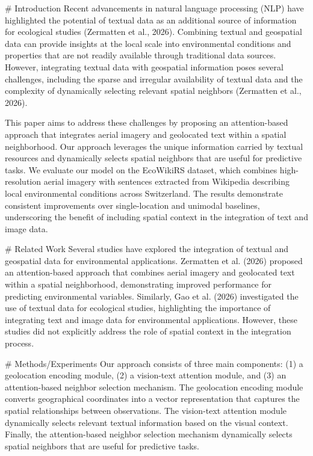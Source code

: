 # Introduction
Recent advancements in natural language processing (NLP) have highlighted the potential of textual data as an additional source of information for ecological studies (Zermatten et al., 2026). Combining textual and geospatial data can provide insights at the local scale into environmental conditions and properties that are not readily available through traditional data sources. However, integrating textual data with geospatial information poses several challenges, including the sparse and irregular availability of textual data and the complexity of dynamically selecting relevant spatial neighbors (Zermatten et al., 2026).

This paper aims to address these challenges by proposing an attention-based approach that integrates aerial imagery and geolocated text within a spatial neighborhood. Our approach leverages the unique information carried by textual resources and dynamically selects spatial neighbors that are useful for predictive tasks. We evaluate our model on the EcoWikiRS dataset, which combines high-resolution aerial imagery with sentences extracted from Wikipedia describing local environmental conditions across Switzerland. The results demonstrate consistent improvements over single-location and unimodal baselines, underscoring the benefit of including spatial context in the integration of text and image data.

# Related Work
Several studies have explored the integration of textual and geospatial data for environmental applications. Zermatten et al. (2026) proposed an attention-based approach that combines aerial imagery and geolocated text within a spatial neighborhood, demonstrating improved performance for predicting environmental variables. Similarly, Gao et al. (2026) investigated the use of textual data for ecological studies, highlighting the importance of integrating text and image data for environmental applications. However, these studies did not explicitly address the role of spatial context in the integration process.

# Methods/Experiments
Our approach consists of three main components: (1) a geolocation encoding module, (2) a vision-text attention module, and (3) an attention-based neighbor selection mechanism. The geolocation encoding module converts geographical coordinates into a vector representation that captures the spatial relationships between observations. The vision-text attention module dynamically selects relevant textual information based on the visual context. Finally, the attention-based neighbor selection mechanism dynamically selects spatial neighbors that are useful for predictive tasks.

